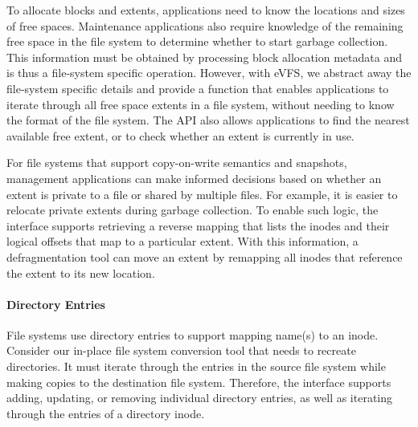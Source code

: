 To allocate blocks and extents, applications need to know the locations and sizes of free spaces. Maintenance applications also require knowledge of the remaining free space in the file system to determine whether to start garbage collection. This information must be obtained by processing block allocation metadata and is thus a file-system specific operation. However, with eVFS, we abstract away the file-system specific details and provide a function that enables applications to iterate through all free space extents in a file system, without needing to know the format of the file system. The API also allows applications to find the nearest available free extent, or to check whether an extent is currently in use.



For file systems that support copy-on-write semantics and snapshots, management applications can make informed decisions based on whether an extent is private to a file or shared by multiple files. For example, it is easier to relocate private extents during garbage collection. To enable such logic, the interface supports retrieving a reverse mapping that lists the inodes and their logical offsets that map to a particular extent. With this information, a defragmentation tool can move an extent by remapping all inodes that reference the extent to its new location.

\vspace{-0.25em}
\paragraph{Directory Entries} File systems use directory entries to support mapping name(s) to an inode. Consider our in-place file system conversion tool that needs to recreate directories. It must iterate through the entries in the source file system while making copies to the destination file system. Therefore, the interface supports adding, updating, or removing individual directory entries, as well as iterating through the entries of a directory inode.

